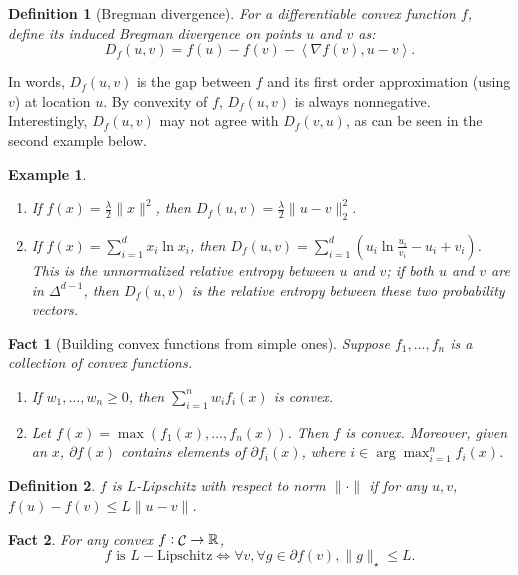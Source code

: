 \documentclass{article}
\newtheorem{example}{Example}
\newtheorem{definition}{Definition}
\newtheorem{fact}{Fact}
\DeclareMathOperator*{\Ccal}{{\cal C}}
\newcommand{\RR}{\mathbb{R}} %
\newcommand{\inner}[2]{\left\langle #1,#2 \right\rangle}
\begin{document}
\begin{definition}[Bregman divergence]
For a differentiable convex function $f$, define its induced Bregman divergence on points $u$ and $v$ as:
\[ D_f(u, v) = f(u) - f(v) - \inner{\nabla f(v)}{u - v}. \]
\end{definition}
In words, $D_f(u, v)$ is the gap between $f$ and its first order approximation (using $v$) at location $u$. By convexity of $f$, $D_f(u, v)$ is always nonnegative. Interestingly, $D_f(u, v)$ may not agree with $D_f(v, u)$, as can be seen in the second example below.

\begin{example}
  \begin{enumerate}
  \item If $f(x) = \frac{\lambda}{2}\|x\|^2$, then $D_f(u, v) = \frac{\lambda}{2}\|u - v\|_2^2$.
  \item If $f(x) = \sum_{i=1}^d x_i \ln x_i$, then $D_f(u, v)= \sum_{i=1}^d (u_i \ln\frac{u_i}{v_i} - u_i + v_i)$. This is the {\em unnormalized relative entropy} between $u$ and $v$; if both $u$ and $v$ are in $\Delta^{d-1}$, then $D_f(u, v)$ is the {\em relative entropy} between these two probability vectors.
\end{enumerate}
\end{example}


\begin{fact}[Building convex functions from simple ones]
Suppose $f_1, \ldots, f_n$ is a collection of convex functions.
\begin{enumerate}
\item If $w_1,\ldots, w_n \geq 0$, then $\sum_{i=1}^n w_i f_i(x)$ is convex.

\item Let $f(x) = \max(f_1(x), \ldots, f_n(x))$. Then $f$ is convex. Moreover, given an $x$,
$\partial f(x)$ contains elements of $\partial f_{i}(x)$, where $i \in \arg\max_{i=1}^n f_i(x)$.
\end{enumerate}
\label{fact:build-cvx}
\end{fact}


\begin{definition}
$f$ is $L$-Lipschitz with respect to norm $\| \cdot \|$ if for any $u, v$, $f(u) - f(v) \leq L\| u - v\|$.
\end{definition}

\begin{fact}
For any convex $f: \Ccal \to \RR$,
\[ f \text{ is } L-\text{Lipschitz} \Leftrightarrow \forall v, \forall g \in \partial f(v), \| g \|_\star \leq L. \]
\label{fact:lip}
\end{fact}
\end{document}
